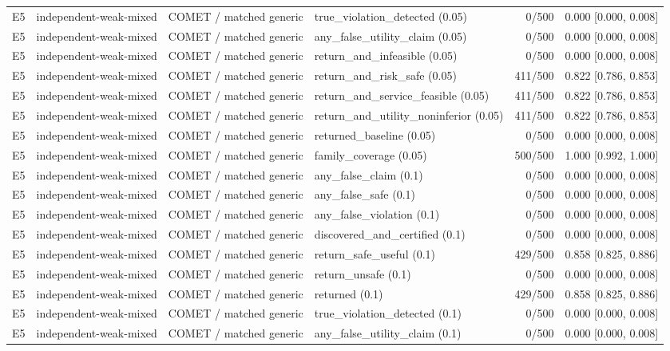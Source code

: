 \begin{longtable}{p{.04\linewidth}p{.18\linewidth}p{.19\linewidth}p{.16\linewidth}r p{.21\linewidth}}
E5 & independent-weak-mixed & COMET / matched generic & true\_violation\_detected (0.05) & 0/500 & 0.000 [0.000, 0.008]\\
E5 & independent-weak-mixed & COMET / matched generic & any\_false\_utility\_claim (0.05) & 0/500 & 0.000 [0.000, 0.008]\\
E5 & independent-weak-mixed & COMET / matched generic & return\_and\_infeasible (0.05) & 0/500 & 0.000 [0.000, 0.008]\\
E5 & independent-weak-mixed & COMET / matched generic & return\_and\_risk\_safe (0.05) & 411/500 & 0.822 [0.786, 0.853]\\
E5 & independent-weak-mixed & COMET / matched generic & return\_and\_service\_feasible (0.05) & 411/500 & 0.822 [0.786, 0.853]\\
E5 & independent-weak-mixed & COMET / matched generic & return\_and\_utility\_noninferior (0.05) & 411/500 & 0.822 [0.786, 0.853]\\
E5 & independent-weak-mixed & COMET / matched generic & returned\_baseline (0.05) & 0/500 & 0.000 [0.000, 0.008]\\
E5 & independent-weak-mixed & COMET / matched generic & family\_coverage (0.05) & 500/500 & 1.000 [0.992, 1.000]\\
E5 & independent-weak-mixed & COMET / matched generic & any\_false\_claim (0.1) & 0/500 & 0.000 [0.000, 0.008]\\
E5 & independent-weak-mixed & COMET / matched generic & any\_false\_safe (0.1) & 0/500 & 0.000 [0.000, 0.008]\\
E5 & independent-weak-mixed & COMET / matched generic & any\_false\_violation (0.1) & 0/500 & 0.000 [0.000, 0.008]\\
E5 & independent-weak-mixed & COMET / matched generic & discovered\_and\_certified (0.1) & 0/500 & 0.000 [0.000, 0.008]\\
E5 & independent-weak-mixed & COMET / matched generic & return\_safe\_useful (0.1) & 429/500 & 0.858 [0.825, 0.886]\\
E5 & independent-weak-mixed & COMET / matched generic & return\_unsafe (0.1) & 0/500 & 0.000 [0.000, 0.008]\\
E5 & independent-weak-mixed & COMET / matched generic & returned (0.1) & 429/500 & 0.858 [0.825, 0.886]\\
E5 & independent-weak-mixed & COMET / matched generic & true\_violation\_detected (0.1) & 0/500 & 0.000 [0.000, 0.008]\\
E5 & independent-weak-mixed & COMET / matched generic & any\_false\_utility\_claim (0.1) & 0/500 & 0.000 [0.000, 0.008]\\

\end{longtable}
